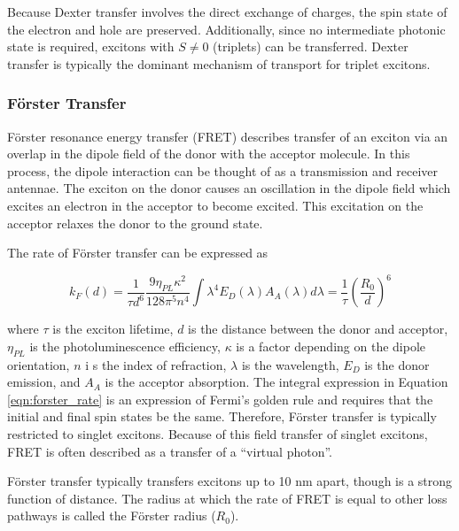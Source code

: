 \documentclass[../thesis.tex]{subfiles}
\begin{document}
Because Dexter transfer involves the direct exchange of charges, the spin state of the electron and hole are preserved.
Additionally, since no intermediate photonic state is required, excitons with $S\neq0$ (triplets) can be transferred.
Dexter transfer is typically the dominant mechanism of transport for triplet excitons.

\subsubsection{F\"{o}rster Transfer}

F\"{o}rster resonance energy transfer (FRET) describes transfer of an exciton via an overlap in the dipole field of the donor with the acceptor molecule.
In this process, the dipole interaction can be thought of as a transmission and receiver antennae.  
The exciton on the donor causes an oscillation in the dipole field which excites an electron in the acceptor to become excited.  
This excitation on the acceptor relaxes the donor to the ground state.

The rate of F\"{o}rster transfer can be expressed as\supercite{Menke2013,Mullenbach2013,Menke2016}

\begin{equation}
k_F(d)=\frac{1}{\tau d^6}\frac{9\eta_{PL}\kappa^2}{128\pi^5n^4}\int{\lambda^4E_D(\lambda)A_A(\lambda)d\lambda}=\frac{1}{\tau}\left(\frac{R_0}{d}\right)^6
\label{eqn:forster_rate}
\end{equation}

where $\tau$ is the exciton lifetime, $d$ is the distance between the donor and acceptor, $\eta_{PL}$ is the photoluminescence efficiency, $\kappa$ is a factor depending on the dipole orientation, $n$ i s the index of refraction, $\lambda$ is the wavelength, $E_D$ is the donor emission,  and $A_A$ is the acceptor absorption.
The integral expression in Equation \ref{eqn:forster_rate} is an expression of Fermi's golden rule and requires that the initial and final spin states be the same.
Therefore, F\"{o}rster transfer is typically restricted to singlet excitons.
Because of this field transfer of singlet excitons, FRET is often described as a transfer of a ``virtual photon''.\supercite{Pope1999,Turro1991a}

F\"{o}rster transfer typically transfers excitons up to 10 nm apart, though is a strong function of distance.\supercite{Menke2013,Luhman2011}
The radius at which the rate of FRET is equal to other loss pathways is called the F\"{o}rster radius ($R_0$).
\end{document}
